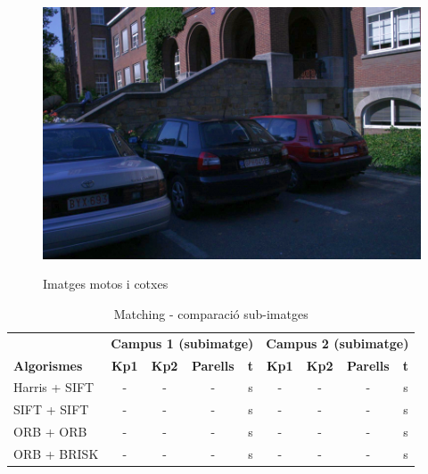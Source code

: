 \begin{figure}[!htb]
				\label{fig:awesome_image3}
			\endminipage\hfill
				\includegraphics[width=\linewidth]{images/experiments/cars6}
				\label{fig:awesome_image3}
			\endminipage
			\caption{Imatges motos i cotxes}
		\end{figure}

		\begin{table}[H]
			\begin{center}
				\begin{tabular}{l | c c c c | c c c c}
					& \multicolumn{4}{c|}{\textbf{Campus 1 (subimatge)}} & \multicolumn{4}{c}{\textbf{Campus 2 (subimatge)}} \\
					\textbf{Algorismes} & \textbf{Kp1} & \textbf{Kp2} & \textbf{Parells} & \textbf{t} & \textbf{Kp1} & \textbf{Kp2} & \textbf{Parells} & \textbf{t} \\ \hline
					Harris + SIFT & - & - & - & s & - & - & - & s \\
					SIFT + SIFT & - & - & - & s & - & - & - & s \\
					ORB + ORB & - & - & - & s & - & - & - & s \\
					ORB + BRISK & - & - & - & s & - & - & - & s \\
				\end{tabular}
			\end{center}
			\caption{Matching - comparació sub-imatges}
		\end{table}

